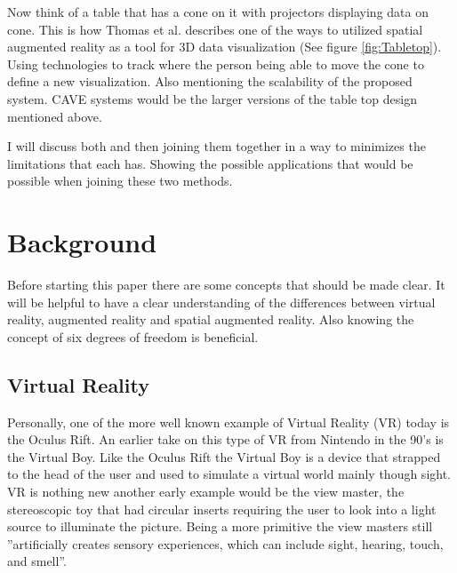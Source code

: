 \documentclass{sig-alternate}
\begin{document}
Now think of a table that has a cone on it with projectors displaying data on cone. This is how Thomas et al. describes one of the ways to utilized spatial augmented reality as a tool for 3D data visualization (See figure \ref{fig:Tabletop}). Using technologies to track where the person being able to move the cone to define a new visualization. Also mentioning the scalability of the proposed system. CAVE systems would be the larger versions of the table top design mentioned above.      

I will discuss both and then joining them together in a way to minimizes the limitations that each has. Showing the possible applications that would be possible when joining these two methods.       


\section{Background}
\label{sec:background} 
Before starting this paper there are some concepts that should be made clear. It will be helpful to have a clear understanding of the differences between virtual reality, augmented reality and spatial augmented reality. Also knowing the concept of six degrees of freedom is beneficial.  

\subsection{Virtual Reality}
\label{sec:Virtual Reality}
Personally, one of the more well known example of Virtual Reality (VR) today is the Oculus Rift. An earlier take on this type of VR from Nintendo in the 90's is the Virtual Boy. Like the Oculus Rift the Virtual Boy is a device that strapped to the head of the user and used to simulate a virtual world mainly though sight. VR is nothing new another early example would be the view master, the stereoscopic toy that had circular inserts requiring the user to look into a light source to illuminate the picture. Being a more primitive the view masters still ''artificially creates sensory experiences, which can include sight, hearing, touch, and smell''\cite{VR}.       
\end{document}

